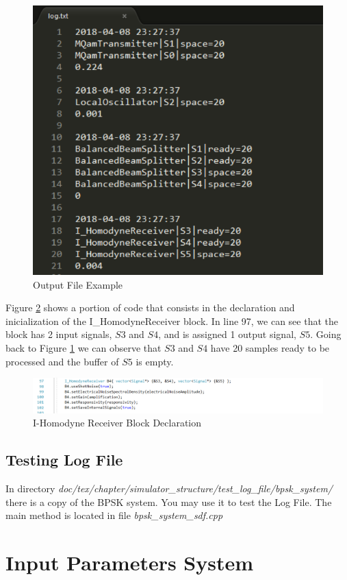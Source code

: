 \begin{refsection}
\renewcommand{\figurename}{Figure}
\begin{figure}[H]
\centering
\includegraphics[width=.35\linewidth]{./chapter/simulator_structure/figures/output_file}
\caption{Output File Example}
\label{fig:outputfile}
\end{figure}

Figure \ref{fig:homodynesignals} shows a portion of code that consists in the declaration and inicialization of the I\_HomodyneReceiver block. In line 97, we can see that the block has 2 input signals, $S3$ and $S4$, and is assigned 1 output signal, $S5$. Going back to Figure \ref{fig:outputfile} we can observe that $S3$ and $S4$ have 20 samples ready to be processed and the buffer of $S5$ is empty.

\renewcommand{\figurename}{Figure}
\begin{figure}[H]
\centering
\includegraphics[width=1.3\linewidth]{./chapter/simulator_structure/figures/homodyne_signals}
\caption{I-Homodyne Receiver Block Declaration}
\label{fig:homodynesignals}
\end{figure}

\subsection{Testing Log File}
In directory \textit{doc/tex/chapter/simulator\_structure/test\_log\_file/bpsk\_system/} there is a copy of the BPSK system. You may use it to test the Log File. The main method is located in file \textit{bpsk\_system\_sdf.cpp}

\clearpage
\printbibliography[heading=subbibliography]
\end{refsection}
\section{Input Parameters System}
